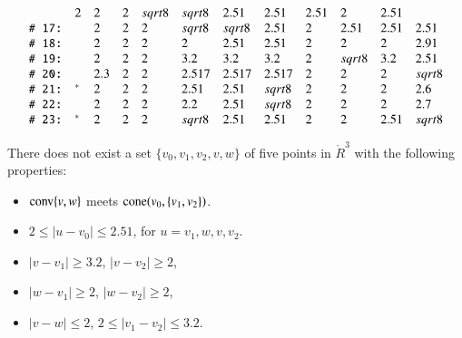 \begin{tarskidata}
\begin{tarski}
\begin{lemma}
$$\begin{array}{llllllllllll}
   &2 &2 &2 &\sqrt{8}& \sqrt{8} &2.51& 2.51 & 2.51 & 2 &  2.51\\
%
 \rr{17}&\tuid{OQXGZCQ}\tlabel{tarski:E:part4:9}
   &2 &2 &2 &\sqrt{8}& \sqrt{8} &2.51& 2 & 2.51 & 2.51 &  2.51\\
%
 \rr{18}&\tuid{GCRJNIH}\tlabel{tarski:E:part4:10}
   &2 &2 &2 &  2& 2.51 &2.51&   2 & 2 & 2 &  2.91\\
%
 \rr{19}&\tuid{QFJLWUC}\tlabel{tarski:dcg-p142}
   &2 &2 &2 &   3.2& 3.2 &3.2&   2 & \sqrt8 & 3.2 &  2.51\\
%
 \rr{20}&\tuid{TADGJXO}\tlabel{tarski:convex-quad}
   &2.3 &2 &2 &   2.517& 2.517 &2.517&  2 & 2 & 2 &  \sqrt8\\
 \rr{21}&\tuid{RPIOZZC}\tlabel{tarski:last:E}\usage{DCG-[11.22]{ remark:2.6}}
   &2 &2 &2 &  2.51& 2.51 &\sqrt8&  2 & 2 & 2 & 2.6\\
%
 \rr{22}&\tuid{JBUAAWJ} \tlabel{tarski:rem2.7}
     &2 &2 &2 &2.2& 2.51 &\sqrt{8}& 2 & 2 & 2 & 2.7\\
%
 \rr{23}&\tuid{NNPXALF} \tlabel{tarski:pass-anchor}\usage{DCG-[4.24]{ lemma:pass-anchor}}
     &2&2&2&\sqrt8 &2.51 &2.51 &2 &2 &2.51&\sqrt8\\
\end{array}$$
\end{lemma}

\begin{proved}
\swallowed\end{proved}
\end{tarski}


 






\begin{tarski}

\begin{lemma}
  There does not exist a set $\{v_0,v_1,v_2,v,w\}$ of five points
in $\ring{R}^3$ with the following properties:
\begin{itemize}
  \item ${\operatorname{conv}}\{v,w\}$ meets ${\operatorname{cone}}(v_0,\{v_1,v_2\})$.
  \item $2\le |u-v_0| \le 2.51$, for $u=v_1,w,v,v_2$.
    \item $|v-v_1|\ge 3.2$,  $|v-v_2|\ge 2$,
    \item $|w-v_1|\ge2$, $|w-v_2|\ge2$,
    \item   $|v-w|\le2$, $2\le |v_1-v_2|\le 3.2$.
\end{itemize}
\end{lemma}


\end{tarski}
\end{tarskidata}
